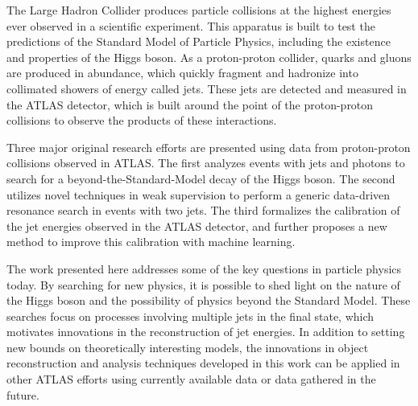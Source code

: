 The Large Hadron Collider produces particle collisions at the highest energies ever observed in a scientific experiment.
This apparatus is built to test the predictions of the Standard Model of Particle Physics, including the existence and properties of the Higgs boson.
As a proton-proton collider, quarks and gluons are produced in abundance, which quickly fragment and hadronize into collimated showers of energy called jets.
These jets are detected and measured in the ATLAS detector, which is built around the point of the proton-proton collisions to observe the products of these interactions.

Three major original research efforts are presented using data from proton-proton collisions observed in ATLAS.
The first analyzes events with jets and photons to search for a beyond-the-Standard-Model decay of the Higgs boson.
The second utilizes novel techniques in weak supervision to perform a generic data-driven resonance search in events with two jets.
The third formalizes the calibration of the jet energies observed in the ATLAS detector, and further proposes a new method to improve this calibration with machine learning.

The work presented here addresses some of the key questions in particle physics today.
By searching for new physics, it is possible to shed light on the nature of the Higgs boson and the possibility of physics beyond the Standard Model. 
These searches focus on processes involving multiple jets in the final state, which motivates innovations in the reconstruction of jet energies.
In addition to setting new bounds on theoretically interesting models, the innovations in object reconstruction and analysis techniques developed in this work can be applied in other ATLAS efforts using currently available data or data gathered in the future.
